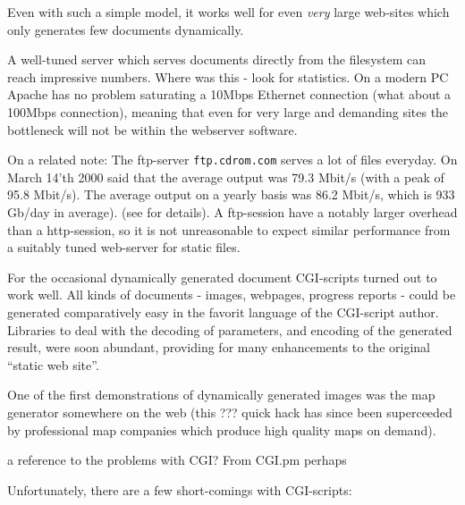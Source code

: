 Even with such a simple model, it works well for even \textit{very}
large web-sites which only generates few documents dynamically.

A well-tuned server which serves documents directly from the
filesystem can reach impressive numbers.  \textsf{Where was this -
look for statistics}.  On a modern PC Apache has no problem saturating
a 10Mbps Ethernet connection (\textsf{what about a 100Mbps
connection)}, meaning that even for very large and demanding sites the
bottleneck will not be within the webserver software.

On a related note: The ftp-server \texttt{ftp.cdrom.com} serves a lot
of files everyday.  On March 14'th 2000
 said that the average output was 79.3 Mbit/s (with a
peak of 95.8 Mbit/s).  The average output on a yearly basis was 86.2
Mbit/s, which is 933 Gb/day in average).
(see  for details).  A
ftp-session have a notably larger overhead than a http-session, so it
is not unreasonable to expect similar performance from a suitably
tuned web-server for static files.

For the occasional dynamically generated document CGI-scripts turned
out to work well.  All kinds of documents - images, webpages, progress
reports - could be generated comparatively easy in the favorit
language of the CGI-script author.  Libraries to deal with the
decoding of parameters, and encoding of the generated result, were
soon abundant, providing for many enhancements to the original
``static web site''.

\label{sec:map-generation-first-web-application} One of the first
demonstrations of dynamically generated images was the \textsf{map
generator somewhere on the web (this ??? quick hack has since been
superceeded by professional map companies which produce high quality
maps on demand)}.


\textsf{a reference to the problems with CGI?  From CGI.pm perhaps}

Unfortunately, there are a few short-comings with CGI-scripts:

